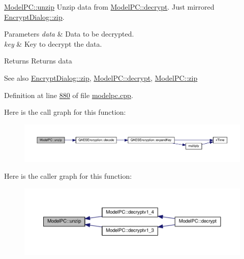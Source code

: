 \hyperlink{class_model_p_c_a6da88f166785a49f73b22c169f956fd0}{Model\+P\+C\+::unzip} Unzip data from \hyperlink{class_model_p_c_a5995215a34a1e1f504035715a8013809}{Model\+P\+C\+::decrypt}. Just mirrored \hyperlink{class_encrypt_dialog_a2bff820a3df4ddc36ecb07ed74b7138a}{Encrypt\+Dialog\+::zip}. 


\begin{DoxyParams}{Parameters}
{\em data} & Data to be decrypted. \\
\hline
{\em key} & Key to decrypt the data. \\
\hline
\end{DoxyParams}
\begin{DoxyReturn}{Returns}
Returns data 
\end{DoxyReturn}
\begin{DoxySeeAlso}{See also}
\hyperlink{class_encrypt_dialog_a2bff820a3df4ddc36ecb07ed74b7138a}{Encrypt\+Dialog\+::zip}, \hyperlink{class_model_p_c_a5995215a34a1e1f504035715a8013809}{Model\+P\+C\+::decrypt}, \hyperlink{class_model_p_c_afebbbfa4b07deba4f68fc6dfb50f353f}{Model\+P\+C\+::zip} 
\end{DoxySeeAlso}


Definition at line \hyperlink{modelpc_8cpp_source_l00880}{880} of file \hyperlink{modelpc_8cpp_source}{modelpc.\+cpp}.



Here is the call graph for this function\+:
\nopagebreak
\begin{figure}[H]
\begin{center}
\leavevmode
\includegraphics[width=350pt]{class_model_p_c_a6da88f166785a49f73b22c169f956fd0_cgraph}
\end{center}
\end{figure}




Here is the caller graph for this function\+:
\nopagebreak
\begin{figure}[H]
\begin{center}
\leavevmode
\includegraphics[width=350pt]{class_model_p_c_a6da88f166785a49f73b22c169f956fd0_icgraph}
\end{center}
\end{figure}


